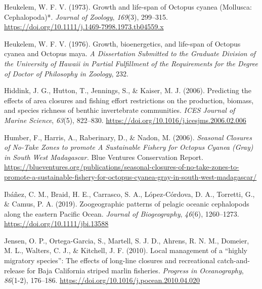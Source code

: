 \documentclass[
]{article}
\newlength{\cslhangindent}
\newlength{\cslentryspacingunit} %
\newenvironment{CSLReferences}[2] %
 {%
  \setlength{\parindent}{0pt}
  \ifodd #1
  \let\oldpar\par
  \def\par{\hangindent=\cslhangindent\oldpar}
  \fi
  \setlength{\parskip}{#2\cslentryspacingunit}
 }%
 {}
\begin{document}
\begin{CSLReferences}{1}{2}
\leavevmode{}%
Heukelem, W. F. V. (1973). Growth and life‐span of {Octopus} cyanea ({Mollusca}: {Cephalopoda})*. \emph{Journal of Zoology}, \emph{169}(3), 299--315. \url{https://doi.org/10.1111/j.1469-7998.1973.tb04559.x}

\leavevmode{}%
Heukelem, W. F. V. (1976). Growth, bioenergetics, and life-span of {Octopus} cyanea and {Octopus} maya. \emph{A Dissertation Submitted to the Graduate Division of the University of Hawaii in Partial Fulfillment of the Requirements for the Degree of Doctor of Philosophy in Zoology}, 232.

\leavevmode{}%
Hiddink, J. G., Hutton, T., Jennings, S., \& Kaiser, M. J. (2006). Predicting the effects of area closures and fishing effort restrictions on the production, biomass, and species richness of benthic invertebrate communities. \emph{ICES Journal of Marine Science}, \emph{63}(5), 822--830. \url{https://doi.org/10.1016/j.icesjms.2006.02.006}

\leavevmode{}%
Humber, F., Harris, A., Raberinary, D., \& Nadon, M. (2006). \emph{Seasonal {Closures} of {No}-{Take} {Zones} to promote {A} {Sustainable} {Fishery} for {Octopus} {Cyanea} ({Gray}) in {South} {West} {Madagascar}.} Blue Ventures Conservation Report. \url{https://blueventures.org/publications/seasonal-closures-of-no-take-zones-to-promote-a-sustainable-fishery-for-octopus-cyanea-gray-in-south-west-madagascar/}

\leavevmode{}%
Ibáñez, C. M., Braid, H. E., Carrasco, S. A., López‐Córdova, D. A., Torretti, G., \& Camus, P. A. (2019). Zoogeographic patterns of pelagic oceanic cephalopods along the eastern {Pacific} {Ocean}. \emph{Journal of Biogeography}, \emph{46}(6), 1260--1273. \url{https://doi.org/10.1111/jbi.13588}

\leavevmode{}%
Jensen, O. P., Ortega-Garcia, S., Martell, S. J. D., Ahrens, R. N. M., Domeier, M. L., Walters, C. J., \& Kitchell, J. F. (2010). Local management of a {``highly migratory species''}: {The} effects of long-line closures and recreational catch-and-release for {Baja} {California} striped marlin fisheries. \emph{Progress in Oceanography}, \emph{86}(1-2), 176--186. \url{https://doi.org/10.1016/j.pocean.2010.04.020}


\end{CSLReferences}
\end{document}
